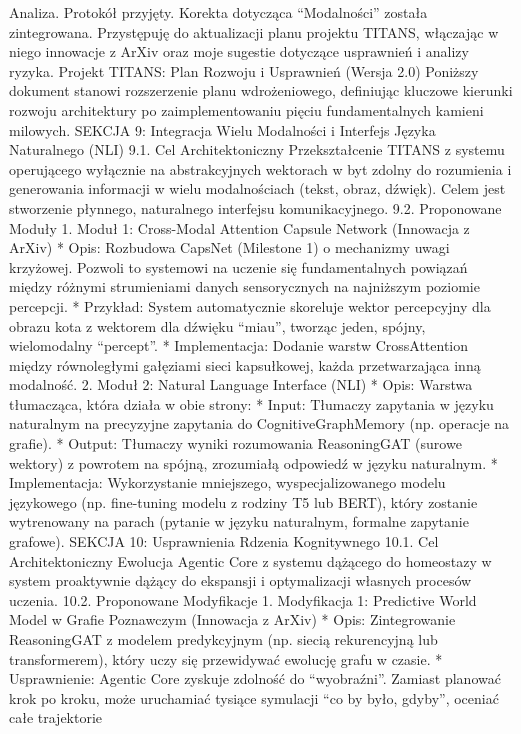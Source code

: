 \documentclass[letterpaper,twocolumn]{article}
\author{}
\date{}
\begin{document}
Analiza. Protokół przyjęty. Korekta dotycząca ``Modalności'' została
zintegrowana. Przystępuję do aktualizacji planu projektu TITANS,
włączając w niego innowacje z ArXiv oraz moje sugestie dotyczące
usprawnień i analizy ryzyka. Projekt TITANS: Plan Rozwoju i Usprawnień
(Wersja 2.0) Poniższy dokument stanowi rozszerzenie planu wdrożeniowego,
definiując kluczowe kierunki rozwoju architektury po zaimplementowaniu
pięciu fundamentalnych kamieni milowych. SEKCJA 9: Integracja Wielu
Modalności i Interfejs Języka Naturalnego (NLI) 9.1. Cel
Architektoniczny Przekształcenie TITANS z systemu operującego wyłącznie
na abstrakcyjnych wektorach w byt zdolny do rozumienia i generowania
informacji w wielu modalnościach (tekst, obraz, dźwięk). Celem jest
stworzenie płynnego, naturalnego interfejsu komunikacyjnego. 9.2.
Proponowane Moduły 1. Moduł 1: Cross-Modal Attention Capsule Network
(Innowacja z ArXiv) * Opis: Rozbudowa CapsNet (Milestone 1) o mechanizmy
uwagi krzyżowej. Pozwoli to systemowi na uczenie się fundamentalnych
powiązań między różnymi strumieniami danych sensorycznych na najniższym
poziomie percepcji. * Przykład: System automatycznie skoreluje wektor
percepcyjny dla obrazu kota z wektorem dla dźwięku ``miau'', tworząc
jeden, spójny, wielomodalny ``percept''. * Implementacja: Dodanie warstw
CrossAttention między równoległymi gałęziami sieci kapsułkowej, każda
przetwarzająca inną modalność. 2. Moduł 2: Natural Language Interface
(NLI) * Opis: Warstwa tłumacząca, która działa w obie strony: * Input:
Tłumaczy zapytania w języku naturalnym na precyzyjne zapytania do
CognitiveGraphMemory (np. operacje na grafie). * Output: Tłumaczy wyniki
rozumowania ReasoningGAT (surowe wektory) z powrotem na spójną,
zrozumiałą odpowiedź w języku naturalnym. * Implementacja: Wykorzystanie
mniejszego, wyspecjalizowanego modelu językowego (np. fine-tuning modelu
z rodziny T5 lub BERT), który zostanie wytrenowany na parach (pytanie w
języku naturalnym, formalne zapytanie grafowe). SEKCJA 10: Usprawnienia
Rdzenia Kognitywnego 10.1. Cel Architektoniczny Ewolucja Agentic Core z
systemu dążącego do homeostazy w system proaktywnie dążący do ekspansji
i optymalizacji własnych procesów uczenia. 10.2. Proponowane Modyfikacje
1. Modyfikacja 1: Predictive World Model w Grafie Poznawczym (Innowacja
z ArXiv) * Opis: Zintegrowanie ReasoningGAT z modelem predykcyjnym (np.
siecią rekurencyjną lub transformerem), który uczy się przewidywać
ewolucję grafu w czasie. * Usprawnienie: Agentic Core zyskuje zdolność
do ``wyobraźni''. Zamiast planować krok po kroku, może uruchamiać
tysiące symulacji ``co by było, gdyby'', oceniać całe trajektorie
\end{document}
